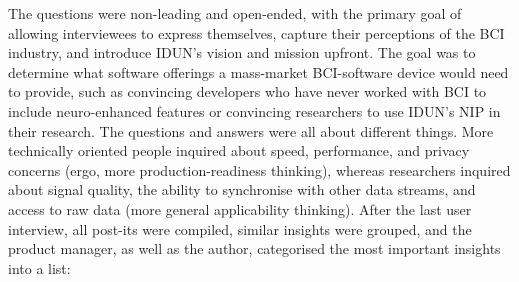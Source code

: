 The questions were non-leading and open-ended, with the primary goal of allowing interviewees to express themselves, capture their perceptions of the BCI industry, and introduce IDUN's vision and mission upfront. The goal was to determine what software offerings a mass-market BCI-software device would need to provide, such as convincing developers who have never worked with BCI to include neuro-enhanced features or convincing researchers to use IDUN's NIP in their research. The questions and answers were all about different things. More technically oriented people inquired about speed, performance, and privacy concerns (ergo, more production-readiness thinking), whereas researchers inquired about signal quality, the ability to synchronise with other data streams, and access to raw data (more general applicability thinking). After the last user interview, all post-its were compiled, similar insights were grouped, and the product manager, as well as the author, categorised the most important insights into a list:

